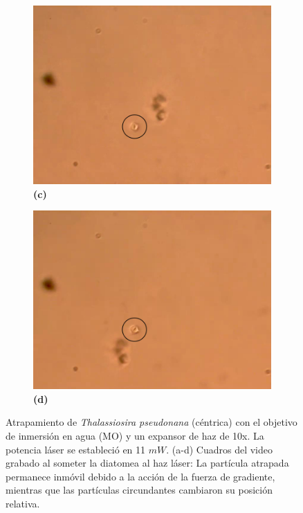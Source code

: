 \documentclass[10pt,aspectratio=1610,compress,dvipsnames]{beamer}
\begin{document}
\begin{frame}
{\begin{figure}
  \begin{subfigure}[b]{0.2\linewidth}
    \includegraphics[width=\linewidth]{Results/Pseudonana water/wpseudonana3.png} %
    \caption*{\textbf{(c)}}
    \label{fig7:c}
  \end{subfigure}\hspace{0.5cm} %
  \begin{subfigure}[b]{0.2\linewidth}
    \includegraphics[width=\linewidth]{Results/Pseudonana water/wpseudonana4.png} %
    \caption*{\textbf{(d)}}
    \label{fig7:d}
  \end{subfigure}
  \caption{
Atrapamiento de \textit{Thalassiosira pseudonana} (céntrica) con el objetivo de inmersión en agua (MO) y un expansor de haz de 10x. La potencia láser se estableció en 11 $mW$. (a-d) Cuadros del video grabado al someter la diatomea al haz láser: La partícula atrapada permanece inmóvil debido a la acción de la fuerza de gradiente, mientras que las partículas circundantes cambiaron su posición relativa. }
  \label{poresfrustrules}
\end{figure}

}



\end{frame}
\end{document}
